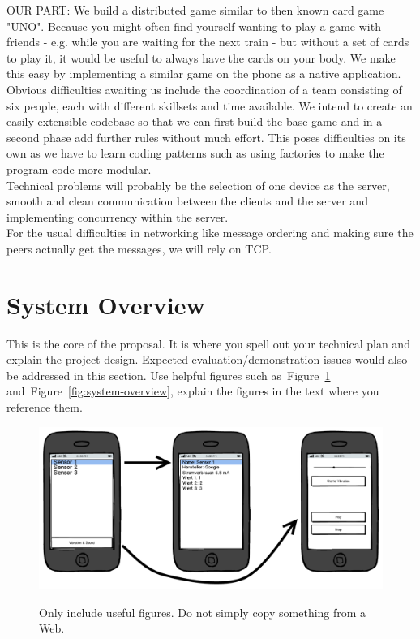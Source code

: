 \documentclass{report}
\newcommand{\lfig}[1]{\label{fig:#1}}
\newcommand{\rfig}[1]{Figure~\ref{fig:#1}}
\begin{document}
OUR PART:
We build a distributed game similar to then known card game "UNO". Because you might often find yourself wanting to play a game with friends - e.g. while you are waiting for the next train - but without a set of cards to play it, it would be useful to always have the cards on your body. We make this easy by implementing a similar game on the phone as a native application.\\

Obvious difficulties awaiting us include the coordination of a team consisting of six people, each with different skillsets and time available.
We intend to create an easily extensible codebase so that we can first build the base game and in a second phase add further rules without much effort. This poses difficulties on its own as we have to learn coding patterns such as using factories to make the program code more modular.\\
Technical problems will probably be the selection of one device as the server, smooth and clean communication between the clients and the server and implementing concurrency within the server.\\

For the usual difficulties in networking like message ordering and making sure the peers actually get the messages, we will rely on TCP.


\section{System Overview}

This is the core of the proposal.
It is where you spell out your technical plan and explain the project design.
Expected evaluation/demonstration issues would also be addressed in this section.
Use helpful figures such as~\rfig{example} and~\rfig{system-overview},
explain the figures in the text where you reference them. 


\begin{figure}[h]
	\centering
    \includegraphics[width=\columnwidth]{example}
    \lfig{example}
    \vspace{-5mm} %
	\caption{Only include useful figures. Do not simply copy something from a Web.}
\end{figure}
\end{document}

